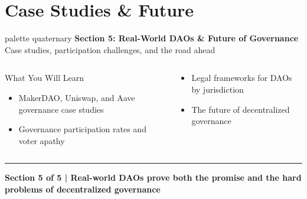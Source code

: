 \documentclass[8pt,aspectratio=169]{beamer}
\newcommand{\bottomnote}[1]{\vfill\vspace{-2mm}\textcolor{mllavender2}{\rule{\textwidth}{0.4pt}}\vspace{1mm}\footnotesize\textbf{#1}}
\begin{document}
\section{Case Studies \& Future}

\begin{frame}
\begin{center}
\begin{beamercolorbox}[sep=12pt,center,rounded=true,shadow=true]{palette quaternary}
{\Large\bfseries Section 5: Real-World DAOs \& Future of Governance}\\[6pt]
{\normalsize Case studies, participation challenges, and the road ahead}
\end{beamercolorbox}

\vspace{4mm}
\begin{columns}[t]
\begin{block}{What You Will Learn}
\begin{itemize}
  \item MakerDAO, Uniswap, and Aave governance case studies
  \item Governance participation rates and voter apathy
\end{itemize}
\end{block}
\begin{block}{}
\begin{itemize}
  \item Legal frameworks for DAOs by jurisdiction
  \item The future of decentralized governance
\end{itemize}
\end{block}
\end{columns}
\end{center}
\bottomnote{Section 5 of 5 | Real-world DAOs prove both the promise and the hard problems of decentralized governance}
\end{frame}
\end{document}
